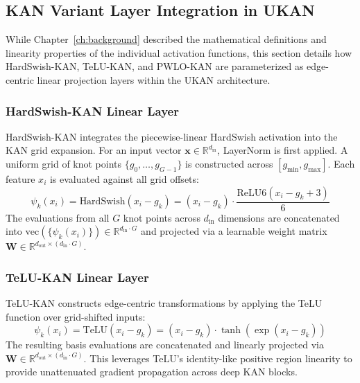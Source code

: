 \documentclass[a4paper]{report}
\begin{document}
\subsection{KAN Variant Layer Integration in UKAN}
\label{sec:kan_variant_integration}
While Chapter~\ref{ch:background} described the mathematical definitions and linearity properties of the individual activation functions, this section details how HardSwish-KAN, TeLU-KAN, and PWLO-KAN are parameterized as edge-centric linear projection layers within the UKAN architecture.

\subsubsection{HardSwish-KAN Linear Layer}
HardSwish-KAN integrates the piecewise-linear HardSwish activation into the KAN grid expansion. For an input vector $\mathbf{x} \in \mathbb{R}^{d_{\text{in}}}$, LayerNorm is first applied. A uniform grid of knot points $\{g_0, \dots, g_{G-1}\}$ is constructed across $[g_{\min}, g_{\max}]$. Each feature $x_i$ is evaluated against all grid offsets:
\begin{equation}
    \psi_k(x_i) = \text{HardSwish}(x_i - g_k) = (x_i - g_k) \cdot \frac{\text{ReLU6}(x_i - g_k + 3)}{6}
\end{equation}
The evaluations from all $G$ knot points across $d_{\text{in}}$ dimensions are concatenated into $\text{vec}\left(\{\psi_k(x_i)\}\right) \in \mathbb{R}^{d_{\text{in}} \cdot G}$ and projected via a learnable weight matrix $\mathbf{W} \in \mathbb{R}^{d_{\text{out}} \times (d_{\text{in}} \cdot G)}$.

\subsubsection{TeLU-KAN Linear Layer}
TeLU-KAN constructs edge-centric transformations by applying the TeLU function over grid-shifted inputs:
\begin{equation}
    \psi_k(x_i) = \text{TeLU}(x_i - g_k) = (x_i - g_k) \cdot \tanh(\exp(x_i - g_k))
\end{equation}
The resulting basis evaluations are concatenated and linearly projected via $\mathbf{W} \in \mathbb{R}^{d_{\text{out}} \times (d_{\text{in}} \cdot G)}$. This leverages TeLU's identity-like positive region linearity to provide unattenuated gradient propagation across deep KAN blocks.
\end{document}

